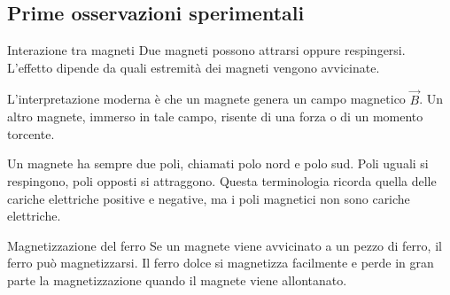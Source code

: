 \documentclass[a4paper]{article}
\begin{document}
\subsection{Prime osservazioni sperimentali}

\begin{snippetproposition}{Interazione tra magneti}
    Due magneti possono attrarsi oppure respingersi. L'effetto dipende da quali estremità dei magneti vengono avvicinate.
\end{snippetproposition}

\begin{center}
\end{center}

L'interpretazione moderna è che un magnete genera un campo magnetico \(\vec{B}\). Un altro magnete, immerso in tale campo, risente di una forza o di un momento torcente.

Un magnete ha sempre due poli, chiamati polo nord e polo sud. Poli uguali si respingono, poli opposti si attraggono. Questa terminologia ricorda quella delle cariche elettriche positive e negative, ma i poli magnetici non sono cariche elettriche.

\begin{snippetproposition}{Magnetizzazione del ferro}
    Se un magnete viene avvicinato a un pezzo di ferro, il ferro può magnetizzarsi. Il ferro dolce si magnetizza facilmente e perde in gran parte la magnetizzazione quando il magnete viene allontanato.
\end{snippetproposition}

\begin{center}
\end{center}
\end{document}
